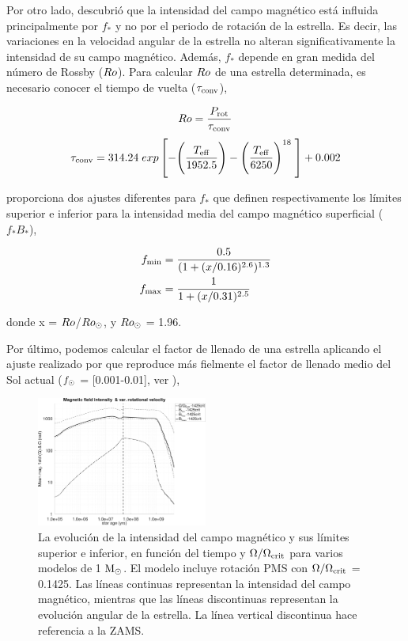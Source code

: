 Por otro lado, \cite{Cranmer2011} descubrió que la intensidad del campo magnético está influida principalmente por $f_*$ y no por el periodo de rotación de la estrella. Es decir, las variaciones en la velocidad angular de la estrella no alteran significativamente la intensidad de su campo magnético. Además, $f_*$ depende en gran medida del número de Rossby ($Ro$). Para calcular $Ro$ de una estrella determinada, es necesario conocer el tiempo de vuelta ($\tau_{\mathrm{conv}}$),

\begin{equation}
	Ro = \frac{P_{\mathrm{rot}}}{\tau_{\mathrm{conv}}} \label{eq:mf_rossby}
\end{equation}
\begin{equation}
	\tau_{\mathrm{conv}} = 314.24\;exp\left[-\Bigg(\frac{T_{\mathrm{eff}}}{1952.5}\Bigg)-\Bigg(\frac{T_{\mathrm{eff}}}{6250}\Bigg)^{18} \;\right]+0.002 \label{eq:mf_turnover}
\end{equation}

\cite{Cranmer2011} proporciona dos ajustes diferentes para $f_*$ que definen respectivamente los límites superior e inferior para la intensidad media del campo magnético superficial ($f_*B_*$),

\begin{align}
	f_{\mathrm{min}} &= \frac{0.5}{(1+(x/0.16)^{2.6})^{1.3}} \label{eq:fmin}\\
	f_{\mathrm{max}} &= \frac{1}{1+(x/0.31)^{2.5}} \label{eq:fmax}
\end{align}

donde x = $Ro$/$Ro_\odot$, y $Ro_\odot$ = 1.96. \par

Por último, podemos calcular el factor de llenado de una estrella aplicando el ajuste realizado por \cite{Gallet2013} que reproduce más fielmente el factor de llenado medio del Sol actual ($f_{\mathrm{\odot}}$ = [0.001-0.01], ver \citep{Cranmer2011}),


\begin{figure}
	\centering
	\includegraphics[width=0.5\textwidth]{img/paper2/mag_field_limits_var_vel_g3.pdf}
	\caption{La evolución de la intensidad del campo magnético y sus límites superior e inferior, en función del tiempo y $\Omega / \Omega_{\mathrm{crit}}$ para varios modelos de 1 $\mathrm{M}_\odot$. El modelo incluye rotación PMS con $\Omega / \Omega_{\mathrm{crit}}$ = 0.1425. Las líneas continuas representan la intensidad del campo magnético, mientras que las líneas discontinuas representan la evolución angular de la estrella. La línea vertical discontinua hace referencia a la ZAMS.}
	\label{fig:mag_field_limits_var_vel_g3}
\end{figure}

